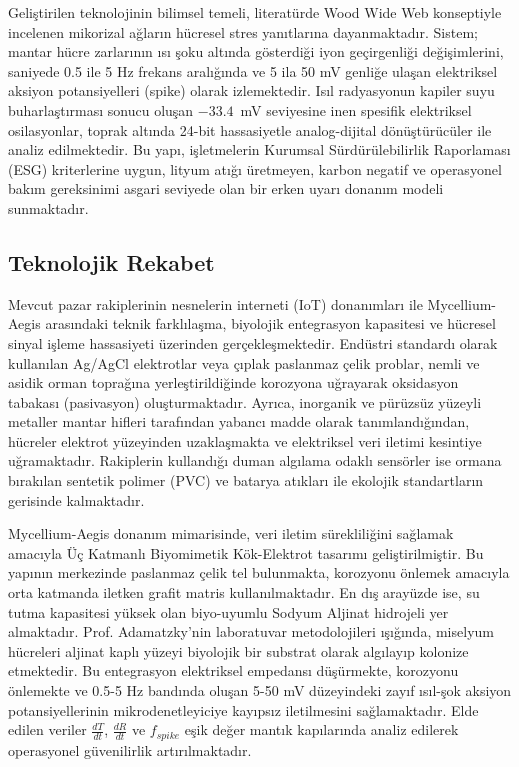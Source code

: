 \documentclass[11pt,a4paper]{article}
\begin{document}
Geliştirilen teknolojinin bilimsel temeli, literatürde Wood Wide Web konseptiyle incelenen mikorizal ağların hücresel stres yanıtlarına dayanmaktadır. Sistem; mantar hücre zarlarının ısı şoku altında gösterdiği iyon geçirgenliği değişimlerini, saniyede 0.5 ile 5 Hz frekans aralığında ve 5 ila 50 mV genliğe ulaşan elektriksel aksiyon potansiyelleri (spike) olarak izlemektedir. Isıl radyasyonun kapiler suyu buharlaştırması sonucu oluşan $-33.4$~mV seviyesine inen spesifik elektriksel osilasyonlar, toprak altında 24-bit hassasiyetle analog-dijital dönüştürücüler ile analiz edilmektedir. Bu yapı, işletmelerin Kurumsal Sürdürülebilirlik Raporlaması (ESG) kriterlerine uygun, lityum atığı üretmeyen, karbon negatif ve operasyonel bakım gereksinimi asgari seviyede olan bir erken uyarı donanım modeli sunmaktadır.

\subsection{Teknolojik Rekabet}

Mevcut pazar rakiplerinin nesnelerin interneti (IoT) donanımları ile Mycellium-Aegis arasındaki teknik farklılaşma, biyolojik entegrasyon kapasitesi ve hücresel sinyal işleme hassasiyeti üzerinden gerçekleşmektedir. Endüstri standardı olarak kullanılan Ag/AgCl elektrotlar veya çıplak paslanmaz çelik problar, nemli ve asidik orman toprağına yerleştirildiğinde korozyona uğrayarak oksidasyon tabakası (pasivasyon) oluşturmaktadır. Ayrıca, inorganik ve pürüzsüz yüzeyli metaller mantar hifleri tarafından yabancı madde olarak tanımlandığından, hücreler elektrot yüzeyinden uzaklaşmakta ve elektriksel veri iletimi kesintiye uğramaktadır. Rakiplerin kullandığı duman algılama odaklı sensörler ise ormana bırakılan sentetik polimer (PVC) ve batarya atıkları ile ekolojik standartların gerisinde kalmaktadır.

Mycellium-Aegis donanım mimarisinde, veri iletim sürekliliğini sağlamak amacıyla Üç Katmanlı Biyomimetik Kök-Elektrot tasarımı geliştirilmiştir. Bu yapının merkezinde paslanmaz çelik tel bulunmakta, korozyonu önlemek amacıyla orta katmanda iletken grafit matris kullanılmaktadır. En dış arayüzde ise, su tutma kapasitesi yüksek olan biyo-uyumlu Sodyum Aljinat hidrojeli yer almaktadır. Prof. Adamatzky'nin laboratuvar metodolojileri ışığında, miselyum hücreleri aljinat kaplı yüzeyi biyolojik bir substrat olarak algılayıp kolonize etmektedir. Bu entegrasyon elektriksel empedansı düşürmekte, korozyonu önlemekte ve 0.5-5 Hz bandında oluşan 5-50 mV düzeyindeki zayıf ısıl-şok aksiyon potansiyellerinin mikrodenetleyiciye kayıpsız iletilmesini sağlamaktadır. Elde edilen veriler $\frac{dT}{dt}$, $\frac{dR}{dt}$ ve $f_{spike}$ eşik değer mantık kapılarında analiz edilerek operasyonel güvenilirlik artırılmaktadır.
\end{document}
